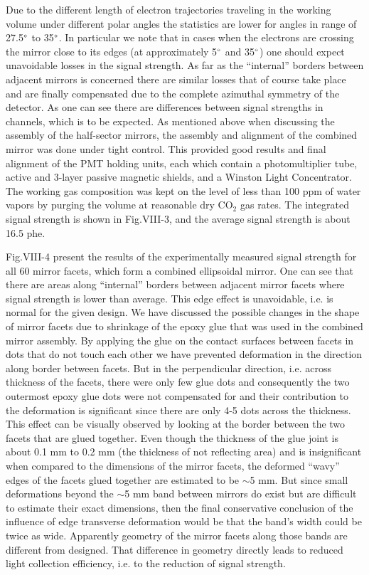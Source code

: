 Due to the different length of electron trajectories traveling in the working volume under different polar angles the statistics are lower for angles in range of 27.5$\degree$ to 35$\degree$. In particular we note that in cases when the electrons are crossing the mirror close to its edges (at approximately 5$\degree$ and 35$\degree$) one should expect unavoidable losses in the signal strength. As far as the “internal” borders between adjacent mirrors is concerned there are similar losses that of course take place and are finally compensated due to the complete azimuthal symmetry of the detector. As one can see there are differences between signal strengths in channels, which is to be expected. As mentioned above when discussing the assembly of the half-sector mirrors, the assembly and alignment of the combined mirror was done under tight control. This provided good results and final alignment of the PMT holding units, each which contain a photomultiplier tube, active and 3-layer passive magnetic shields, and a Winston Light Concentrator. The working gas composition was kept on the level of less than 100 ppm of water vapors by purging the volume at reasonable dry CO${_2}$ gas rates. The integrated signal strength is shown in Fig.VIII-3, and the average signal strength is about 16.5 phe.    

\indent Fig.VIII-4 present the results of the experimentally measured signal strength for all 60 mirror facets, which form a combined ellipsoidal mirror. One can see that there are areas along “internal” borders between adjacent mirror facets where signal strength is lower than average. This edge effect is unavoidable, i.e. is normal for the given design. We have discussed the possible changes in the shape of mirror facets due to shrinkage of the epoxy glue that was used in the combined mirror assembly. By applying the glue on the contact surfaces between facets in dots that do not touch each other we have prevented deformation in the direction along border between facets. But in the perpendicular direction, i.e. across thickness of the facets, there were only few glue dots and consequently the two outermost epoxy glue dots were not compensated for and their contribution to the deformation is significant since there are only 4-5 dots across the thickness. This effect can be visually observed by looking at the border between the two facets that are glued together. Even though the thickness of the glue joint is about 0.1 mm to 0.2 mm (the thickness of not reflecting area) and is insignificant when compared to the dimensions of the mirror facets, the deformed “wavy” edges of the facets glued together are estimated to be $\sim$5 mm. But since small deformations beyond the $\sim$5 mm band between mirrors do exist but are difficult to estimate their exact dimensions, then the final conservative conclusion of the influence of edge transverse deformation would be that the band’s width could be twice as wide. Apparently geometry of the mirror facets along those bands are different from designed. That difference in geometry directly leads to reduced light collection efficiency, i.e. to the reduction of signal strength.
